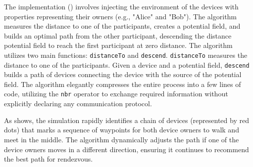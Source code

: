 The implementation () involves injecting the environment of the devices with properties representing their owners (e.g., "Alice" and "Bob"). The algorithm measures the distance to one of the participants, creates a potential field, and builds an optimal path from the other participant, descending the distance potential field to reach the first participant at zero distance. The algorithm utilizes two main functions: \texttt{distanceTo} and \texttt{descend}. \texttt{distanceTo} measures the distance to one of the participants. Given a device and a potential field, \texttt{descend} builds a path of devices connecting the device with the source of the potential field. The algorithm elegantly compresses the entire process into a few lines of code, utilizing the \texttt{nbr} operator to exchange required information without explicitly declaring any communication protocol.

As  shows, the simulation rapidly identifies a chain of devices (represented by red dots) that marks a sequence of waypoints for both device owners to walk and meet in the middle. The algorithm dynamically adjusts the path if one of the device owners moves in a different direction, ensuring it continues to recommend the best path for rendezvous.



